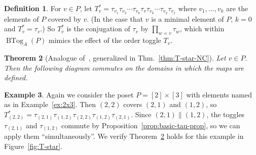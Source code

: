 \documentclass[10pt]{amsart}
\newtheorem{theo}{Theorem}[section]
\theoremstyle{definition}
\newtheorem{defi}[theo]{Definition}
\newtheorem{exam}[theo]{Example}
\newcommand{\kk}{\mathbb{K}}
\newcommand{\up}{\Delta}
\DeclareMathOperator{\BTog}{BTog}
\newenvironment{absolutelynopagebreak}
 {\par\nobreak\vfil\penalty0\vfilneg
 \vtop\bgroup}
 {\par\xdef\tpd{\the\prevdepth}\egroup
 \prevdepth=\tpd}
\begin{document}
\begin{defi}
For $v\in P$, let $T_v^* =\tau_{v_1}\tau_{v_2}\cdots \tau_{v_k} \tau_v \tau_{v_k}\cdots
\tau_{v_2}\tau_{v_1}$ where $v_1,\dots,v_k$ are the elements of $P$ covered by $v$. (In the
case that $v$ is a minimal element of $P$, $k=0$ and $T_v^*=\tau_v$.) So $T_v^*$ is the
conjugation of $\tau_{v}$ by $\prod_{w\lessdot v}\tau_{w}$, which within $\BTog_{A}(P)$ mimics the effect of
the order toggle $T_{v}$. 

\end{defi}

\begin{theo}[{Analogue of~\cite[Thm.~2.15]{antichain-toggling}, generalized in Thm.~\ref{thm:T-star-NC}}]\label{thm:T-star}
Let $v\in P$. Then the following diagram commutes on the domains in which the maps are defined.
\begin{center}
\end{center}
\end{theo}

\begin{exam}\label{ex:T-star}
Again we consider the poset $P=[2]\times[3]$ with elements named as in Example~\ref{ex:2x3}.
Then $(2,2)$ covers $(2,1)$ and $(1,2)$, so
$T_{(2,2)}^*=\tau_{(2,1)}\tau_{(1,2)} \tau_{(2,2)} \tau_{(1,2)}\tau_{(2,1)}$.
Since
$(2,1)\parallel (1,2)$, the toggles $\tau_{(2,1)}$ and $\tau_{(1,2)}$ commute by
Proposition~\ref{prop:basic-tau-prop}, so we can apply them ``simultaneously''.
We verify
Theorem~\ref{thm:T-star} holds for this example in Figure~\ref{fig:T-star}.
\end{exam}
\end{document}
